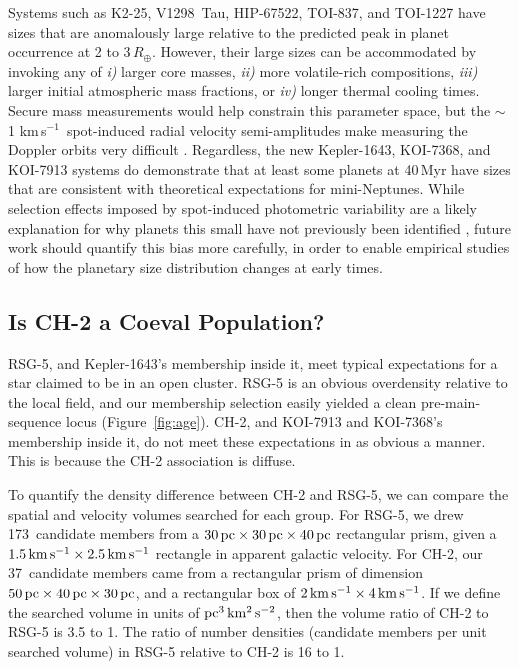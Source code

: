 \documentclass[12pt,twocolumn,tighten,linenumbers]{aastex63}
\newcommand{\nchtwo}{37} %
\newcommand{\nrsgfive}{173} %
\newcommand{\kms}{\,km\,s$^{-1}$}
\newcommand{\mkms}{{\rm \,km\,s^{-1}}}  %
\begin{document}
Systems such as K2-25, V1298~Tau, HIP-67522, TOI-837, and TOI-1227
have sizes that are anomalously large relative to the predicted peak
in planet occurrence at 2 to 3\,$R_\oplus$.  However, their large
sizes can be accommodated by invoking any of {\it i)} larger core
masses, {\it ii)} more volatile-rich compositions, {\it iii)}  larger
initial atmospheric mass fractions, or {\it iv)} longer thermal
cooling times.  Secure mass measurements would help constrain this
parameter space, but the $\sim$1\,\kms\ spot-induced radial velocity
semi-amplitudes make measuring the Doppler orbits very difficult
\citep[][]{cale_diving_2021,zicher_one_2022,klein_one_2022}.
Regardless, the new Kepler-1643, KOI-7368, and KOI-7913 systems do
demonstrate that at least some planets at 40\,Myr have sizes that are
consistent with theoretical expectations for mini-Neptunes.  While
selection effects imposed by spot-induced photometric variability are
a likely explanation for why planets this small have not previously
been identified \citep[{e.g.},][]{zhou_2021_tois}, future work should
quantify this bias more carefully, in order to enable empirical
studies of how the planetary size distribution changes at early times.


\subsection{Is CH-2 a Coeval Population?}
\label{subsec:ch2}

RSG-5, and Kepler-1643's membership inside it, meet typical
expectations for a star claimed to be in an open cluster.  RSG-5 is an
obvious overdensity relative to the local field, and our membership
selection easily yielded a clean pre-main-sequence locus
(Figure~\ref{fig:age}).  CH-2, and KOI-7913 and KOI-7368's membership
inside it, do not meet these expectations in as obvious a manner.
This is because the CH-2 association is diffuse.

To quantify the density difference between CH-2 and RSG-5, we can
compare the spatial and velocity volumes searched for each group.  For
RSG-5, we drew \nrsgfive\ candidate members from a $30\,{\rm
pc}\times30\,{\rm pc}\times40\,{\rm pc}$ rectangular prism, given a
$1.5 {\rm \mkms} \times 2.5 {\rm \mkms }$ rectangle in apparent
galactic velocity.  For CH-2, our \nchtwo\ candidate members came from
a rectangular prism of dimension $50\,{\rm pc}\times40\,{\rm
pc}\times30\,{\rm pc}$, and a rectangular box of $2 {\rm \mkms} \times
4 {\rm \mkms}$.  If we define the searched volume in units of ${\rm
pc}^3\,{\rm km^2}\,{\rm s^{-2}}$, then the volume ratio of CH-2 to
RSG-5 is 3.5 to 1.  The ratio of number densities (candidate members
per unit searched volume) in RSG-5 relative to CH-2 is 16 to 1.
\end{document}
